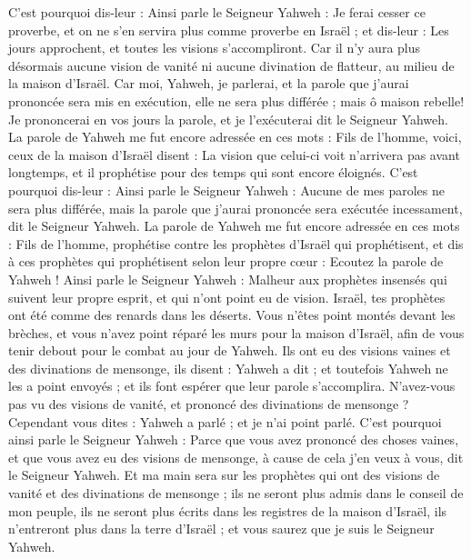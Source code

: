 \begin{multicols}{2}
C'est pourquoi dis-leur : Ainsi parle le Seigneur Yahweh : Je ferai cesser ce proverbe, et on ne s'en servira plus comme proverbe en Israël ; et dis-leur : Les jours approchent, et toutes les visions s'accompliront.
Car il n'y aura plus désormais aucune vision de vanité ni aucune divination de flatteur, au milieu de la maison d'Israël.
Car moi, Yahweh, je parlerai, et la parole que j'aurai prononcée sera mis en exécution, elle ne sera plus différée ; mais ô maison rebelle! Je prononcerai en vos jours la parole, et je l'exécuterai dit le Seigneur Yahweh.
La parole de Yahweh me fut encore adressée en ces mots :
Fils de l'homme, voici, ceux de la maison d'Israël disent : La vision que celui-ci voit n'arrivera pas avant longtemps, et il prophétise pour des temps qui sont encore éloignés.
C'est pourquoi dis-leur : Ainsi parle le Seigneur Yahweh : Aucune de mes paroles ne sera plus différée, mais la parole que j'aurai prononcée sera exécutée incessament, dit le Seigneur Yahweh.
\VerseOne{}La parole de Yahweh me fut encore adressée en ces mots :
Fils de l'homme, prophétise contre les prophètes d'Israël qui prophétisent, et dis à ces prophètes qui prophétisent selon leur propre cœur : Ecoutez la parole de Yahweh !
Ainsi parle le Seigneur Yahweh : Malheur aux prophètes insensés qui suivent leur propre esprit, et qui n'ont point eu de vision.
Israël, tes prophètes ont été comme des renards dans les déserts.
Vous n'êtes point montés devant les brèches, et vous n'avez point réparé les murs pour la maison d'Israël, afin de vous tenir debout pour le combat au jour de Yahweh.
Ils ont eu des visions vaines et des divinations de mensonge, ils disent : Yahweh a dit ; et toutefois Yahweh ne les a point envoyés ; et ils font espérer que leur parole s'accomplira.
N'avez-vous pas vu des visions de vanité, et prononcé des divinations de mensonge ? Cependant vous dites : Yahweh a parlé ; et je n'ai point parlé.
C'est pourquoi ainsi parle le Seigneur Yahweh : Parce que vous avez prononcé des choses vaines, et que vous avez eu des visions de mensonge, à cause de cela j'en veux à vous, dit le Seigneur Yahweh.
Et ma main sera sur les prophètes qui ont des visions de vanité et des divinations de mensonge ; ils ne seront plus admis dans le conseil de mon peuple, ils ne seront plus écrits dans les registres de la maison d'Israël, ils n'entreront plus dans la terre d'Israël ; et vous saurez que je suis le Seigneur Yahweh.

\end{multicols}
